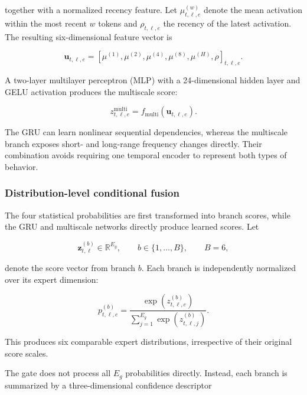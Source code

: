\documentclass[conference]{IEEEtran}
\begin{document}
together with a normalized recency feature. Let
\(\mu_{t,\ell,e}^{(w)}\) denote the mean activation within the most recent
\(w\) tokens and \(\rho_{t,\ell,e}\) the recency of the latest activation.
The resulting six-dimensional feature vector is

\begin{equation}
\mathbf{u}_{t,\ell,e}
=
\left[
\mu^{(1)},
\mu^{(2)},
\mu^{(4)},
\mu^{(8)},
\mu^{(H)},
\rho
\right]_{t,\ell,e}.
\label{eq:multiscale-features}
\end{equation}

A two-layer multilayer perceptron (MLP) with a 24-dimensional hidden layer and
GELU activation produces the multiscale score:

\begin{equation}
z_{t,\ell,e}^{\mathrm{multi}}
=
f_{\mathrm{multi}}
\left(
\mathbf{u}_{t,\ell,e}
\right).
\label{eq:multiscale-branch}
\end{equation}

The GRU can learn nonlinear sequential dependencies, whereas the multiscale
branch exposes short- and long-range frequency changes directly. Their
combination avoids requiring one temporal encoder to represent both types of
behavior.

\subsubsection{Distribution-level conditional fusion}

The four statistical probabilities are first transformed into branch scores,
while the GRU and multiscale networks directly produce learned scores. Let

\begin{equation}
\mathbf{z}_{t,\ell}^{(b)}
\in\mathbb{R}^{E_g},
\qquad
b\in\{1,\ldots,B\},
\qquad
B=6,
\end{equation}

denote the score vector from branch \(b\). Each branch is independently
normalized over its expert dimension:

\begin{equation}
p_{t,\ell,e}^{(b)}
=
\frac{
\exp\!\left(z_{t,\ell,e}^{(b)}\right)
}{
\displaystyle
\sum_{j=1}^{E_g}
\exp\!\left(z_{t,\ell,j}^{(b)}\right)
}.
\label{eq:branch-normalization}
\end{equation}

This produces six comparable expert distributions, irrespective of their
original score scales.

The gate does not process all \(E_g\) probabilities directly. Instead, each
branch is summarized by a three-dimensional confidence descriptor
\end{document}
